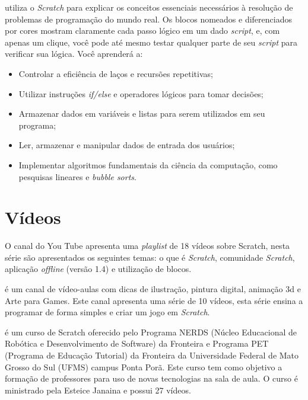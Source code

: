 \documentclass[12pt,fleqn]{book} %
\begin{document}
\textcite{marji2014aprenda} utiliza o \textit{Scratch} para explicar os conceitos essenciais necessários à resolução de problemas de programação do mundo real. Os blocos nomeados e diferenciados por cores mostram claramente cada passo lógico em um dado \textit{script}, e, com apenas um clique, você pode até mesmo testar qualquer parte de seu \textit{script} para verificar sua lógica. Você aprenderá a:

\begin{itemize}
	\item Controlar a eficiência de laços e recursões repetitivas;
	\item Utilizar instruções \textit{if/else} e operadores lógicos para tomar decisões;
	\item Armazenar dados em variáveis e listas para serem utilizados em seu programa;
	
	\item Ler, armazenar e manipular dados de entrada dos usuários;
	\item Implementar algoritmos fundamentais da ciência da computação, como pesquisas lineares e \textit{bubble sorts}.
\end{itemize}

\section{Vídeos}

O canal do You Tube \textcite{apensarem2018} apresenta uma \textit{playlist} de 18 vídeos sobre Scratch, nesta série são apresentados os seguintes temas: o que é \textit{Scratch}, comunidade \textit{Scratch}, aplicação \textit{offline} (versão 1.4) e utilização de blocos.
	
\textcite{ilustradicas2018} é um canal de vídeo-aulas com dicas de ilustração, pintura digital, animação 3d e Arte para Games. Este canal apresenta uma série de 10 vídeos, esta série ensina a programar de forma simples e criar um jogo em \textit{Scratch}. 
	
\textcite{cursocompleto2018} é um curso de Scratch oferecido pelo Programa NERDS (Núcleo Educacional de Robótica e Desenvolvimento de Software) da Fronteira e Programa PET (Programa de Educação Tutorial) da Fronteira da Universidade Federal de Mato Grosso do Sul (UFMS) campus Ponta Porã. Este curso tem como objetivo a formação de professores para uso de novas tecnologias na sala de aula. O curso é ministrado pela Esteice Janaina e possui 27 vídeos.
	
\end{document}
